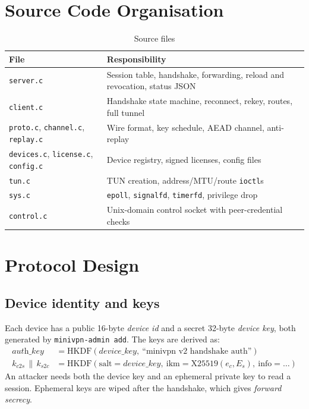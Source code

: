 \documentclass[12pt,a4paper]{report}
\begin{document}
\section{Source Code Organisation}
\begin{table}[H]
\centering
\caption{Source files}
\begin{tabularx}{\textwidth}{@{}lX@{}}
\toprule
\textbf{File} & \textbf{Responsibility}\\
\midrule
\texttt{server.c} & Session table, handshake, forwarding, reload and revocation, status JSON\\
\texttt{client.c} & Handshake state machine, reconnect, rekey, routes, full tunnel\\
\texttt{proto.c}, \texttt{channel.c}, \texttt{replay.c} & Wire format, key schedule, AEAD channel, anti-replay\\
\texttt{devices.c}, \texttt{license.c}, \texttt{config.c} & Device registry, signed licenses, config files\\
\texttt{tun.c} & TUN creation, address/MTU/route \texttt{ioctl}s\\
\texttt{sys.c} & \texttt{epoll}, \texttt{signalfd}, \texttt{timerfd}, privilege drop\\
\texttt{control.c} & Unix-domain control socket with peer-credential checks\\
\bottomrule
\end{tabularx}
\end{table}

\section{Protocol Design}

\subsection{Device identity and keys}
Each device has a public 16-byte \emph{device id} and a secret 32-byte \emph{device key},
both generated by \texttt{minivpn-admin add}. The keys are derived as:
\[
\begin{aligned}
\textit{auth\_key} &= \mathrm{HKDF}(\textit{device\_key},\ \text{``minivpn v2 handshake auth''})\\
k_{c2s} \,\|\, k_{s2c} &= \mathrm{HKDF}(\text{salt}=\textit{device\_key},\ \text{ikm}=\mathrm{X25519}(e_c, E_s),\ \text{info}=\ldots)
\end{aligned}
\]
An attacker needs both the device key and an ephemeral private key to read a session.
Ephemeral keys are wiped after the handshake, which gives \emph{forward secrecy}.
\end{document}
